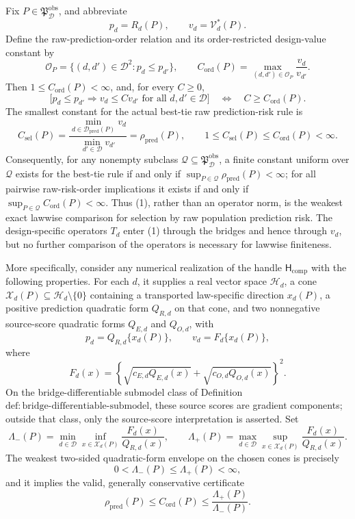 Fix \(P\in\mathfrak P_{\mathcal D}^{\mathrm{obs}}\), and abbreviate
\[
 p_d=R_d(P),
 \qquad v_d=\mathcal V_d^*(P).
\]
Define the raw-prediction-order relation and its order-restricted design-value constant by
\[
 \mathcal O_P=\{(d,d')\in\mathcal D^2:p_d\le p_{d'}\},
 \qquad
 C_{\mathrm{ord}}(P)=\max_{(d,d')\in\mathcal O_P}\frac{v_d}{v_{d'}}. \tag{1}
\]
Then \(1\le C_{\mathrm{ord}}(P)<\infty\), and, for every \(C\ge0\),
\[
 \bigl[p_d\le p_{d'}\Longrightarrow v_d\le C v_{d'}
 \text{ for all }d,d'\in\mathcal D\bigr]
 \quad\Longleftrightarrow\quad C\ge C_{\mathrm{ord}}(P). \tag{2}
\]
The smallest constant for the actual best-tie raw prediction-risk rule is
\[
 C_{\mathrm{sel}}(P)
 =\frac{\min_{d\in\mathcal D_{\mathrm{pred}}(P)}v_d}
 {\min_{d'\in\mathcal D}v_{d'}}
 =\rho_{\mathrm{pred}}(P),
 \qquad
 1\le C_{\mathrm{sel}}(P)\le C_{\mathrm{ord}}(P)<\infty. \tag{3}
\]
Consequently, for any nonempty subclass \(\mathcal Q\subseteq\mathfrak P_{\mathcal D}^{\mathrm{obs}}\), a finite constant uniform over \(\mathcal Q\) exists for the best-tie rule if and only if \(\sup_{P\in\mathcal Q}\rho_{\mathrm{pred}}(P)<\infty\); for all pairwise raw-risk-order implications it exists if and only if \(\sup_{P\in\mathcal Q}C_{\mathrm{ord}}(P)<\infty\). Thus (1), rather than an operator norm, is the weakest exact lawwise comparison for selection by raw population prediction risk. The design-specific operators \(T_d\) enter (1) through the bridges and hence through \(v_d\), but no further comparison of the operators is necessary for lawwise finiteness.

More specifically, consider any numerical realization of the handle \(\mathsf H_{\mathrm{comp}}\) with the following properties. For each \(d\), it supplies a real vector space \(\mathcal H_d\), a cone \(\mathcal X_d(P)\subseteq\mathcal H_d\setminus\{0\}\) containing a transported law-specific direction \(x_d(P)\), a positive prediction quadratic form \(Q_{R,d}\) on that cone, and two nonnegative source-score quadratic forms \(Q_{E,d}\) and \(Q_{O,d}\), with
\[
 p_d=Q_{R,d}\{x_d(P)\},
 \qquad v_d=F_d\{x_d(P)\}, \tag{4}
\]
where
\[
 F_d(x)=\left\{\sqrt{c_{E,d}Q_{E,d}(x)}+\sqrt{c_{O,d}Q_{O,d}(x)}\right\}^2. \tag{5}
\]
On the bridge-differentiable submodel class of Definition~\(\mathrm{def{:}bridge\text{-}differentiable\text{-}submodel}\), these source scores are gradient components; outside that class, only the source-score interpretation is asserted. Set
\[
 \Lambda_-(P)=\min_{d\in\mathcal D}\inf_{x\in\mathcal X_d(P)}\frac{F_d(x)}{Q_{R,d}(x)},
 \qquad
 \Lambda_+(P)=\max_{d\in\mathcal D}\sup_{x\in\mathcal X_d(P)}\frac{F_d(x)}{Q_{R,d}(x)}. \tag{6}
\]
The weakest two-sided quadratic-form envelope on the chosen cones is precisely
\[
 0<\Lambda_-(P)\le\Lambda_+(P)<\infty, \tag{7}
\]
and it implies the valid, generally conservative certificate
\[
 \rho_{\mathrm{pred}}(P)\le C_{\mathrm{ord}}(P)\le\frac{\Lambda_+(P)}{\Lambda_-(P)}. \tag{8}
\]

